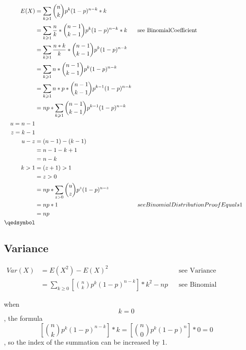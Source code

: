 \documentclass[]{article}
\begin{document}
\begin{align}
E(X) &= \sum_{k \geqslant 1} \binom{n}{k} p^k (1-p)^{n-k} * k\\
&= \sum_{k \geqslant 1} \frac{n}{k} * \binom{n-1}{k-1} p^k (1-p)^{n-k} * k && \text{see BinomialCoefficient}\\
&= \sum_{k \geqslant 1} \frac{n*k}{k} * \binom{n-1}{k-1} p^k (1-p)^{n-k}\\
&= \sum_{k \geqslant 1} n * \binom{n-1}{k-1} p^k (1-p)^{n-k}\\
&= \sum_{k \geqslant 1} n*p * \binom{n-1}{k-1} p^{k-1} (1-p)^{n-k}\\
&= np * \sum_{k \geqslant 1} \binom{n-1}{k-1} p^{k-1} (1-p)^{n-k}\\
u = n-1\\
z = k-1\\
u-z&=(n-1)-(k-1)\\
&=n-1-k+1\\
&=n-k\\
k>1&=(z+1)>1\\
&=z>0\\
&= np * \sum_{z>0} \binom{u}{z} p^{z} (1-p)^{u-z}\\
&= np * 1 && see BinomialDistributionProofEquals1\\
&= np\\
\qedsymbol
\end{align}

\subsection {Variance}

\begin{align}
	Var(X) &= E(X^2) - E(X)^2 && \text{see Variance}\\
	&= \sum_{k \geqslant 0} {[\binom{n} {k} p^k (1-p)^{n-k}]*k^2} - np && \text{see Binomial Expected Value}
\end{align}

when $$k=0$$, the formula $$[\binom{n} {k} p^k (1-p)^{n-k}] * k = [\binom{n} {0} p^k (1-p)^n] * 0 = 0$$, so the index of the summation can be increased by 1.
\end{document}
